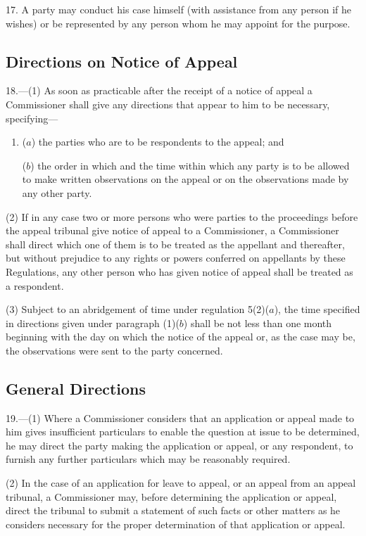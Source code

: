 \documentclass[12pt,a4paper]{article}
\begin{document}
17.  A party may conduct his case himself (with assistance from any person if he wishes) or be represented by any person whom he may appoint for the purpose.

\subsection[18. Directions on Notice of Appeal]{Directions on Notice of Appeal}

18.—(1) As soon as practicable after the receipt of a notice of appeal a Commissioner shall give any directions that appear to him to be necessary, specifying---
\begin{enumerate}\item[]
($a$) the parties who are to be respondents to the appeal; and

($b$) the order in which and the time within which any party is to be allowed to make written observations on the appeal or on the observations made by any other party.
\end{enumerate}

(2) If in any case two or more persons who were parties to the proceedings before the appeal tribunal give notice of appeal to a Commissioner, a Commissioner shall direct which one of them is to be treated as the appellant and thereafter, but without prejudice to any rights or powers conferred on appellants by these Regulations, any other person who has given notice of appeal shall be treated as a respondent.

(3) Subject to an abridgement of time under regulation 5(2)($a$), the time specified in directions given under paragraph (1)($b$) shall be not less than one month beginning with the day on which the notice of the appeal or, as the case may be, the observations were sent to the party concerned.

\subsection[19. General Directions]{General Directions}

19.—(1) Where a Commissioner considers that an application or appeal made to him gives insufficient particulars to enable the question at issue to be determined, he may direct the party making the application or appeal, or any respondent, to furnish any further particulars which may be reasonably required.

(2) In the case of an application for leave to appeal, or an appeal from an appeal tribunal, a Commissioner may, before determining the application or appeal, direct the tribunal to submit a statement of such facts or other matters as he considers necessary for the proper determination of that application or appeal.
\end{document}
